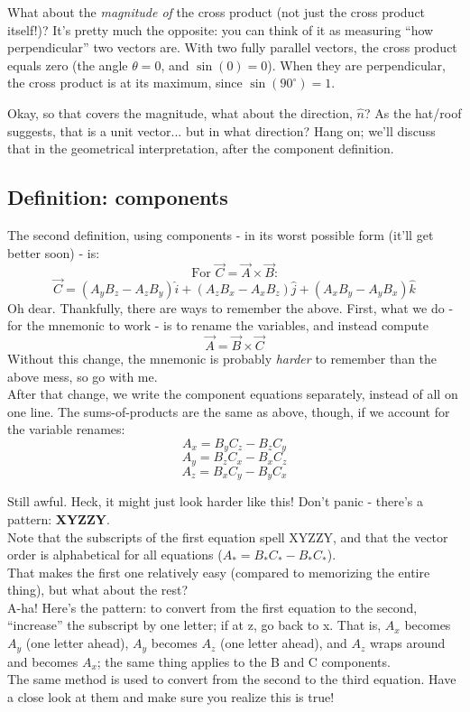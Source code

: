 \documentclass[12pt,a4paper]{report}
\begin{document}
What about the \emph{magnitude of} the cross product (not just the cross product itself!)? It's pretty much the opposite: you can think of it as measuring ``how perpendicular'' two vectors are. With two fully parallel vectors, the cross product equals zero (the angle $\theta = 0$, and $\sin{(0)} = 0$). When they are perpendicular, the cross product is at its maximum, since $\sin{(90^\circ)} = 1$.

Okay, so that covers the magnitude, what about the direction, $\hat{n}$? As the hat/roof suggests, that is a unit vector... but in what direction? Hang on; we'll discuss that in the geometrical interpretation, after the component definition.

\subsection{Definition: components}

The second definition, using components - in its worst possible form (it'll get better soon) - is:
\[ \text{For } \vec{C} = \vec{A} \times \vec{B}\text{:} \]
\[ \vec{C} = (A_y B_z - A_z B_y) \hat{i} + (A_z B_x - A_x B_z) \hat{j} + (A_x B_y - A_y B_x) \hat{k} \]
Oh dear. Thankfully, there are ways to remember the above. First, what we do - for the mnemonic to work - is to rename the variables, and instead compute
\[ \vec{A} = \vec{B} \times \vec{C} \]
Without this change, the mnemonic is probably \emph{harder} to remember than the above mess, so go with me.\\
After that change, we write the component equations separately, instead of all on one line. The sums-of-products are the same as above, though, if we account for the variable renames:
\[ A_x = B_y C_z - B_z C_y \]
\[ A_y = B_z C_x - B_x C_z \]
\[ A_z = B_x C_y - B_y C_x \]

Still awful. Heck, it might just look harder like this! Don't panic - there's a pattern: {\bf XYZZY}.\\
Note that the subscripts of the first equation spell XYZZY, and that the vector order is alphabetical for all equations ($A_* = B_* C_* - B_* C_*$).\\
That makes the first one relatively easy (compared to memorizing the entire thing), but what about the rest?\\
A-ha! Here's the pattern: to convert from the first equation to the second, ``increase'' the subscript by one letter; if at z, go back to x. That is, $A_x$ becomes $A_y$ (one letter ahead), $A_y$ becomes $A_z$ (one letter ahead), and $A_z$ wraps around and becomes $A_x$; the same thing applies to the B and C components.\\
The same method is used to convert from the second to the third equation. Have a close look at them and make sure you realize this is true!
\end{document}
